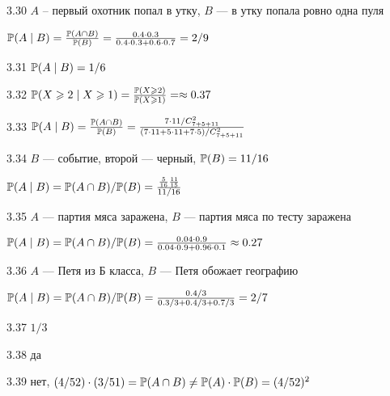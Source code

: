 \protect \hypertarget {soln:3.30}{}
\begin{solution}{{3.30}}
  $A$ -- первый охотник попал в утку, $B$ — в утку попала ровно одна пуля

  $\P(A \mid B)=\frac{\P(A \cap B)}{\P(B)}= \frac{0.4 \cdot 0.3 }{0.4\cdot 0.3 + 0.6\cdot 0.7}=2/9$
\end{solution}
\protect \hypertarget {soln:3.31}{}
\begin{solution}{{3.31}}
  $\P(A \mid B)=1/6$
\end{solution}
\protect \hypertarget {soln:3.32}{}
\begin{solution}{{3.32}}
  $\P(X\geq 2 \mid X\geq 1)=\frac{\P(X \geq 2)}{\P(X \geq 1)}= \approx 0.37$
\end{solution}
\protect \hypertarget {soln:3.33}{}
\begin{solution}{{3.33}}
  $\P(A \mid B)=\frac{\P(A \cap B)}{\P(B)}= \frac{7\cdot 11 /C_{7+5+11}^2}{(7\cdot 11+5\cdot 11 + 7\cdot 5) /C_{7+5+11}^2 }$
\end{solution}
\protect \hypertarget {soln:3.34}{}
\begin{solution}{{3.34}}
  $B$ — событие, второй — черный, $\P(B)=11/16$

  $\P(A \mid B)=\P(A \cap B)/\P(B)=\frac{\frac{5}{16}\frac{11}{15}}{11/16}$
\end{solution}
\protect \hypertarget {soln:3.35}{}
\begin{solution}{{3.35}}
  $A$ — партия мяса заражена, $B$ — партия мяса по тесту заражена

  $\P(A \mid B)=\P(A \cap B)/\P(B)=\frac{0.04\cdot 0.9}{0.04\cdot 0.9+0.96\cdot 0.1}\approx 0.27$
\end{solution}
\protect \hypertarget {soln:3.36}{}
\begin{solution}{{3.36}}
  $A$ — Петя из Б класса, $B$ — Петя обожает географию

  $\P(A \mid B)=\P(A \cap B)/\P(B)=\frac{0.4/3}{0.3/3+0.4/3+0.7/3}=2/7$
\end{solution}
\protect \hypertarget {soln:3.37}{}
\begin{solution}{{3.37}}
  $1/3$
\end{solution}
\protect \hypertarget {soln:3.38}{}
\begin{solution}{{3.38}}
  да
\end{solution}
\protect \hypertarget {soln:3.39}{}
\begin{solution}{{3.39}}
  нет, $(4/52)\cdot (3/51)=\P(A\cap B) \neq \P(A)\cdot \P(B)=(4/52)^2$
\end{solution}
